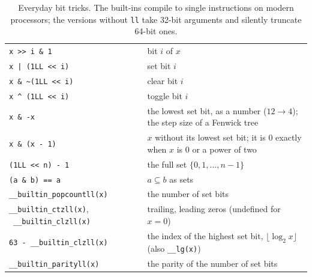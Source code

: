 \begin{table}[htbp]
\centering
\small
\begin{tabular}{@{}l P{9.2cm}@{}}
  \toprule
   &  \\
  \midrule
  \texttt{x >{}> i \& 1} & bit $i$ of $x$ \\
  \texttt{x | (1LL <{}< i)} & set bit $i$ \\
  \texttt{x \& \textasciitilde(1LL <{}< i)} & clear bit $i$ \\
  \texttt{x \textasciicircum{} (1LL <{}< i)} & toggle bit $i$ \\
  \texttt{x \& -x} & the lowest set bit, as a number ($12 \to 4$); the step size of a Fenwick tree \\
  \texttt{x \& (x - 1)} & $x$ without its lowest set bit; it is 0 exactly when $x$ is 0 or a power of two \\
  \texttt{(1LL <{}< n) - 1} & the full set $\{0, 1, \ldots, n-1\}$ \\
  \texttt{(a \& b) == a} & $a \subseteq b$ as sets \\
  \texttt{\_\_builtin\_popcountll(x)} & the number of set bits \\
  \texttt{\_\_builtin\_ctzll(x)}, \ \texttt{\_\_builtin\_clzll(x)} & trailing, leading zeros (undefined for $x = 0$) \\
  \texttt{63 - \_\_builtin\_clzll(x)} & the index of the highest set bit, $\lfloor \log_2 x\rfloor$ (also \texttt{\_\_lg(x)}) \\
  \texttt{\_\_builtin\_parityll(x)} & the parity of the number of set bits \\
  \bottomrule
\end{tabular}
\caption{Everyday bit tricks. The built-ins compile to single instructions on modern processors; the versions without
\texttt{ll} take 32-bit arguments and silently truncate 64-bit ones.}
\label{tab:bittricks}
\end{table}

